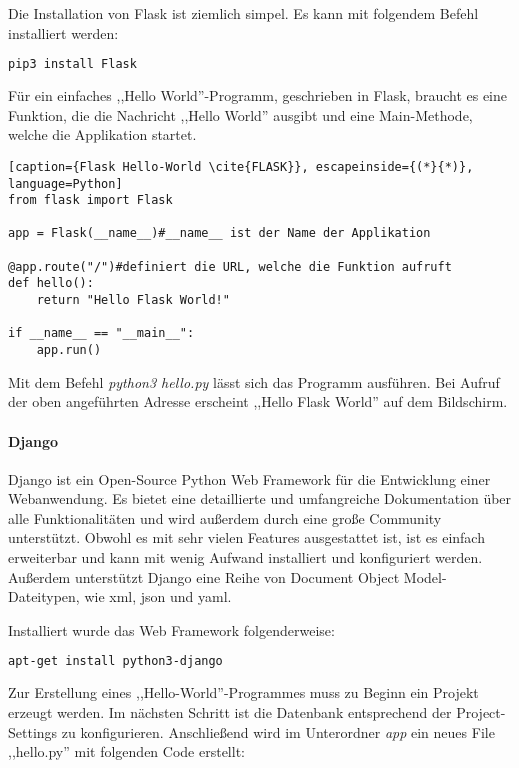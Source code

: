 Die Installation von Flask ist ziemlich simpel. Es kann mit folgendem Befehl installiert werden:
\begin{lstlisting}[caption={Installation von Flask \cite{FLASK}}, language=bash]
pip3 install Flask
\end{lstlisting}

Für ein einfaches ,,Hello World''-Programm, geschrieben in Flask, braucht es eine Funktion, die die Nachricht ,,Hello World'' ausgibt und eine Main-Methode, welche die Applikation startet.

\begin{lstlisting}[caption={Flask Hello-World \cite{FLASK}}, escapeinside={(*}{*)}, language=Python]
from flask import Flask

app = Flask(__name__)#__name__ ist der Name der Applikation

@app.route("/")#definiert die URL, welche die Funktion aufruft
def hello():
	return "Hello Flask World!"

if __name__ == "__main__":
    app.run()
\end{lstlisting}

Mit dem Befehl \textit{python3 hello.py} lässt sich das Programm ausführen. Bei Aufruf der oben angeführten Adresse erscheint ,,Hello Flask World'' auf dem Bildschirm.

\paragraph{Django}
Django ist ein Open-Source Python Web Framework für die Entwicklung einer Webanwendung. Es bietet eine detaillierte und umfangreiche Dokumentation über alle Funktionalitäten und wird außerdem durch eine große Community unterstützt. Obwohl es mit sehr vielen Features ausgestattet ist, ist es einfach erweiterbar und kann mit wenig Aufwand installiert und konfiguriert werden. Außerdem unterstützt Django eine Reihe von Document Object Model-Dateitypen, wie xml, json und yaml. \cite{DJANGO}

Installiert wurde das Web Framework folgenderweise:
\begin{lstlisting}[caption={Installation von Django\cite{DJANGOIN}}, language=bash]
apt-get install python3-django
\end{lstlisting}

Zur Erstellung eines ,,Hello-World''-Programmes muss zu Beginn ein Projekt erzeugt werden. Im nächsten Schritt ist die Datenbank entsprechend der Project-Settings zu konfigurieren. Anschließend wird im Unterordner \textit{app} ein neues File ,,hello.py'' mit folgenden Code erstellt:

